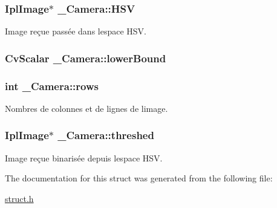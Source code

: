 \subsubsection[{\texorpdfstring{H\+SV}{HSV}}]{\setlength{\rightskip}{0pt plus 5cm}Ipl\+Image$\ast$ \+\_\+\+Camera\+::\+H\+SV}\hypertarget{struct___camera_acded182f5a3fc70318c5fca5b19bb9fe}{}\label{struct___camera_acded182f5a3fc70318c5fca5b19bb9fe}
Image reçue passée dans l\textquotesingle{}espace H\+SV. 
\subsubsection[{\texorpdfstring{lower\+Bound}{lowerBound}}]{\setlength{\rightskip}{0pt plus 5cm}Cv\+Scalar \+\_\+\+Camera\+::lower\+Bound}\hypertarget{struct___camera_a2fbe653d44adfd2e41d64b8ee08911f1}{}\label{struct___camera_a2fbe653d44adfd2e41d64b8ee08911f1}
\subsubsection[{\texorpdfstring{rows}{rows}}]{\setlength{\rightskip}{0pt plus 5cm}int \+\_\+\+Camera\+::rows}\hypertarget{struct___camera_a703a36cc8065f37869cc02c6b0e1c87f}{}\label{struct___camera_a703a36cc8065f37869cc02c6b0e1c87f}
Nombres de colonnes et de lignes de l\textquotesingle{}image. 
\subsubsection[{\texorpdfstring{threshed}{threshed}}]{\setlength{\rightskip}{0pt plus 5cm}Ipl\+Image$\ast$ \+\_\+\+Camera\+::threshed}\hypertarget{struct___camera_a07cebbf32e748bf08365cfe9e0726430}{}\label{struct___camera_a07cebbf32e748bf08365cfe9e0726430}
Image reçue binarisée depuis l\textquotesingle{}espace H\+SV. 

The documentation for this struct was generated from the following file\+:\begin{DoxyCompactItemize}
\item 
\hyperlink{struct_8h}{struct.\+h}\end{DoxyCompactItemize}
